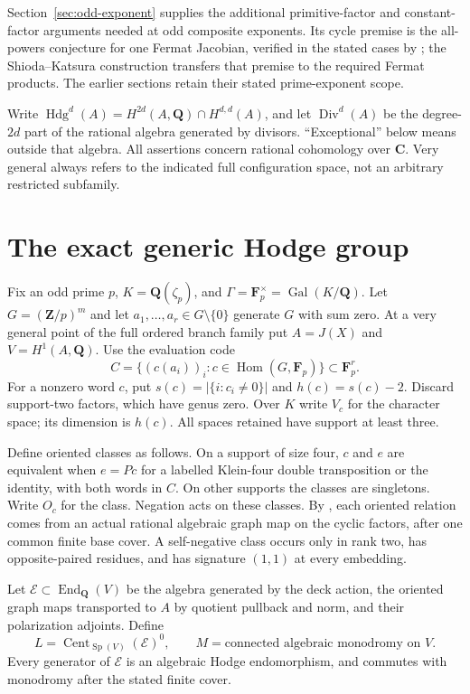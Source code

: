 \documentclass[11pt]{article}
\theoremstyle{definition}
\newcommand{\Q}{\mathbf Q}
\newcommand{\C}{\mathbf C}
\newcommand{\Z}{\mathbf Z}
\newcommand{\F}{\mathbf F}
\newcommand{\Sp}{\operatorname{Sp}}
\newcommand{\Hdg}{\operatorname{Hdg}}
\newcommand{\Div}{\operatorname{Div}}
\newcommand{\End}{\operatorname{End}}
\newcommand{\Hom}{\operatorname{Hom}}
\newcommand{\Gal}{\operatorname{Gal}}
\newcommand{\Cent}{\operatorname{Cent}}
\begin{document}
Section~\ref{sec:odd-exponent} supplies the additional primitive-factor
and constant-factor arguments needed at odd composite exponents. Its
cycle premise is the all-powers conjecture for one Fermat Jacobian,
verified in the stated cases by \cite{Aoki2000}; the Shioda--Katsura
construction \cite{SK} transfers that premise to the required Fermat
products. The earlier sections retain their stated prime-exponent scope.

Write $\Hdg^d(A)=H^{2d}(A,\Q)\cap H^{d,d}(A)$, and let $\Div^d(A)$
be the degree-$2d$ part of the rational algebra generated by divisors.
``Exceptional'' below means outside that algebra. All assertions concern
rational cohomology over $\C$. Very general always refers to the indicated
full configuration space, not an arbitrary restricted subfamily.

\section{The exact generic Hodge group}\label{sec:hg}
Fix an odd prime $p$, $K=\Q(\zeta_p)$, and
$\Gamma=\F_p^\times=\Gal(K/\Q)$. Let $G=(\Z/p)^m$ and let
$a_1,\ldots,a_r\in G\setminus\{0\}$ generate $G$ with sum zero.
At a very general point of the full ordered branch family put
$A=J(X)$ and $V=H^1(A,\Q)$. Use the evaluation code
\[
 C=\{(c(a_i))_i:c\in\Hom(G,\F_p)\}\subset\F_p^r.
\]
For a nonzero word $c$, put $s(c)=|\{i:c_i\ne0\}|$ and
$h(c)=s(c)-2$. Discard support-two factors, which have genus zero.
Over $K$ write $V_c$ for the character space; its dimension is $h(c)$.
All spaces retained have support at least three.

Define oriented classes as follows. On a support of size four, $c$ and $e$
are equivalent when $e=Pc$ for a labelled Klein-four double transposition
or the identity, with both words in $C$. On other supports the classes are
singletons. Write $O_c$ for the class. Negation acts on these classes.
By \cite[Section 3]{General}, each oriented relation comes from an actual
rational algebraic graph map on the cyclic factors, after one common finite
base cover. A self-negative class occurs only in rank two, has
opposite-paired residues, and has signature $(1,1)$ at every embedding.

Let $\mathcal E\subset\End_\Q(V)$ be the algebra generated by the deck
action, the oriented graph maps transported to $A$ by quotient pullback and
norm, and their polarization adjoints. Define
\[
 L=\Cent_{\Sp(V)}(\mathcal E)^0,
 \qquad M=\text{connected algebraic monodromy on }V.
\]
Every generator of $\mathcal E$ is an algebraic Hodge endomorphism, and
commutes with monodromy after the stated finite cover.
\end{document}
